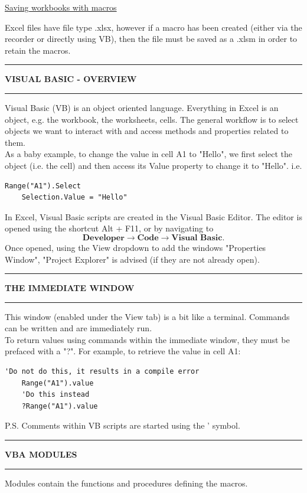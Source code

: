 \documentclass[8pt]{extarticle}
\newcommand{\heading}[1]{%
    \noindent
    \rule{\linewidth}{0.4pt}
    \begin{center}
        \vspace{-1ex}
        \textbf{#1}        
        \vspace{-2.5ex}
    \end{center}
    \rule{\linewidth}{0.4pt}
}
\begin{document}
\begin{multicols}{3}
\begin{center}
    \underline{Saving workbooks with macros}
\end{center}

Excel files have file type .xlsx, however if a macro has been created (either via the recorder or directly using VB), then the file must be saved as a .xlsm in order to retain the macros.

\columnbreak
\heading{VISUAL BASIC - OVERVIEW}

Visual Basic (VB) is an object oriented language. Everything in Excel is an object, e.g. the workbook, the worksheets, cells. The general workflow is to select objects we want to interact with and access methods and properties related to them. \\

As a baby example, to change the value in cell A1 to "Hello", we first select the object (i.e. the cell) and then access its Value property to change it to "Hello". i.e. 
\begin{lstlisting}[style=vba]
    Range("A1").Select
    Selection.Value = "Hello"
\end{lstlisting}

In Excel, Visual Basic scripts are created in the Visual Basic Editor. The editor is opened using the shortcut Alt + F11, or by navigating to 
\[\textbf{Developer} \rightarrow \textbf{Code} \rightarrow \textbf{Visual Basic}. \]
Once opened, using the View dropdown to add the windows "Properties Window", "Project Explorer" is advised (if they are not already open).

\heading{THE IMMEDIATE WINDOW}

This window (enabled under the View tab) is a bit like a terminal. Commands can be written and are immediately run.\\

To return values using commands within the immediate window, they must be prefaced with a "?". For example, to retrieve the value in cell A1:

\begin{lstlisting}[style=vba]
    'Do not do this, it results in a compile error
    Range("A1").value 
    'Do this instead
    ?Range("A1").value
\end{lstlisting}

P.S. Comments within VB scripts are started using the ' symbol.

\heading{VBA MODULES}

Modules contain the functions and procedures defining the macros. \\


\end{multicols}
\end{document}
